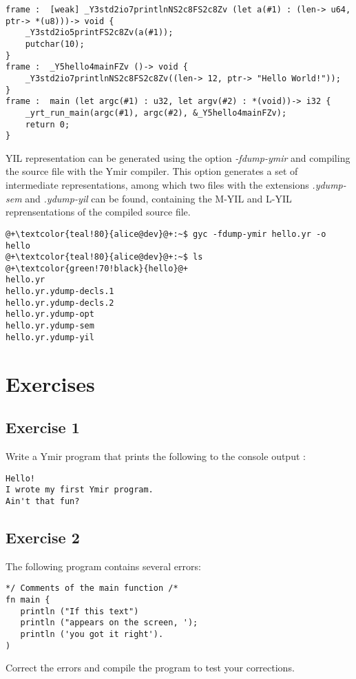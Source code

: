 \begin{lstlisting}[style=lyilVerb, caption=L-YIL reprensentation of \textit{hello.yr}]
frame :  [weak] _Y3std2io7printlnNS2c8FS2c8Zv (let a(#1) : (len-> u64, ptr-> *(u8)))-> void {
    _Y3std2io5printFS2c8Zv(a(#1));
    putchar(10);
}
frame :  _Y5hello4mainFZv ()-> void {
    _Y3std2io7printlnNS2c8FS2c8Zv((len-> 12, ptr-> "Hello World!"));
}
frame :  main (let argc(#1) : u32, let argv(#2) : *(void))-> i32 {
    _yrt_run_main(argc(#1), argc(#2), &_Y5hello4mainFZv);
    return 0;
}
\end{lstlisting}


YIL representation can be generated using the option \textit{-fdump-ymir} and
compiling the source file with the Ymir compiler. This option generates a set of
intermediate representations, among which two files with the extensions
\textit{.ydump-sem} and \textit{.ydump-yil} can be found, containing the M-YIL and L-YIL reprensentations of the compiled
source file.

\begin{lstlisting}[style=bashVerb, escapechar=@+]
@+\textcolor{teal!80}{alice@dev}@+:~$ gyc -fdump-ymir hello.yr -o hello
@+\textcolor{teal!80}{alice@dev}@+:~$ ls
@+\textcolor{green!70!black}{hello}@+
hello.yr
hello.yr.ydump-decls.1
hello.yr.ydump-decls.2
hello.yr.ydump-opt
hello.yr.ydump-sem
hello.yr.ydump-yil
\end{lstlisting}

\section{Exercises}
\subsection{Exercise 1}

Write a Ymir program that prints the following to the console output :
\begin{verbatim}
Hello!
I wrote my first Ymir program.
Ain't that fun?
\end{verbatim}

\subsection{Exercise 2}
The following program contains several errors:

\begin{lstlisting}[style=bashVerb, caption=Ymir program with errors]
*/ Comments of the main function /*
fn main {
   println ("If this text")
   println ("appears on the screen, ');
   println ('you got it right').
)
\end{lstlisting}
Correct the errors and compile the program to test your corrections.


